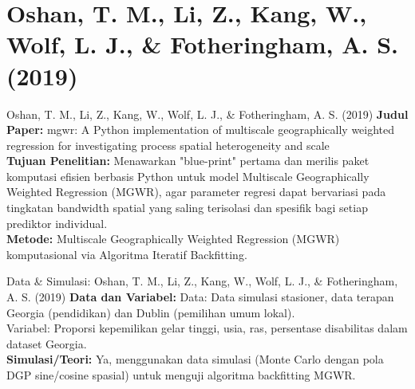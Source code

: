 \documentclass{beamer}
\begin{document}
\section{Oshan, T. M., Li, Z., Kang, W., Wolf, L. J., \& Fotheringham, A. S. (2019)}
\begin{frame}[allowframebreaks]{Oshan, T. M., Li, Z., Kang, W., Wolf, L. J., \& Fotheringham, A. S. (2019)}
\textbf{Judul Paper:} mgwr: A Python implementation of multiscale geographically weighted regression for investigating process spatial heterogeneity and scale \\[0.3cm]
\textbf{Tujuan Penelitian:} Menawarkan "blue-print" pertama dan merilis paket komputasi efisien berbasis Python untuk model Multiscale Geographically Weighted Regression (MGWR), agar parameter regresi dapat bervariasi pada tingkatan bandwidth spatial yang saling terisolasi dan spesifik bagi setiap prediktor individual. \\[0.3cm]
\textbf{Metode:} Multiscale Geographically Weighted Regression (MGWR) komputasional via Algoritma Iteratif Backfitting.
\end{frame}

\begin{frame}[allowframebreaks]{Data \& Simulasi: Oshan, T. M., Li, Z., Kang, W., Wolf, L. J., \& Fotheringham, A. S. (2019)}
\textbf{Data dan Variabel:} Data: Data simulasi stasioner, data terapan Georgia (pendidikan) dan Dublin (pemilihan umum lokal).\\ Variabel: Proporsi kepemilikan gelar tinggi, usia, ras, persentase disabilitas dalam dataset Georgia. \\[0.3cm]
\textbf{Simulasi/Teori:} Ya, menggunakan data simulasi (Monte Carlo dengan pola DGP sine/cosine spasial) untuk menguji algoritma backfitting MGWR.
\end{frame}
\end{document}

